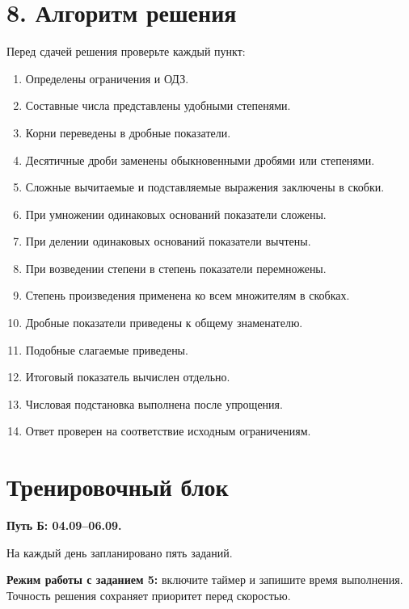 \documentclass[a4paper,12pt]{article}
\newcommand{\checkitem}{\(\square\)\;}
\begin{document}
\section{8. Алгоритм решения}

Перед сдачей решения проверьте каждый пункт:

\begin{enumerate}[label=\checkitem]
  \item Определены ограничения и ОДЗ.
  \item Составные числа представлены удобными степенями.
  \item Корни переведены в дробные показатели.
  \item Десятичные дроби заменены обыкновенными дробями или степенями.
  \item Сложные вычитаемые и подставляемые выражения заключены в скобки.
  \item При умножении одинаковых оснований показатели сложены.
  \item При делении одинаковых оснований показатели вычтены.
  \item При возведении степени в степень показатели перемножены.
  \item Степень произведения применена ко всем множителям в скобках.
  \item Дробные показатели приведены к общему знаменателю.
  \item Подобные слагаемые приведены.
  \item Итоговый показатель вычислен отдельно.
  \item Числовая подстановка выполнена после упрощения.
  \item Ответ проверен на соответствие исходным ограничениям.
\end{enumerate}

\clearpage

\section{Тренировочный блок}

\textbf{Путь Б: 04.09--06.09.}

На каждый день запланировано пять заданий.

\textbf{Режим работы с заданием 5:}
включите таймер и запишите время выполнения.
Точность решения сохраняет приоритет перед скоростью.

\end{document}
